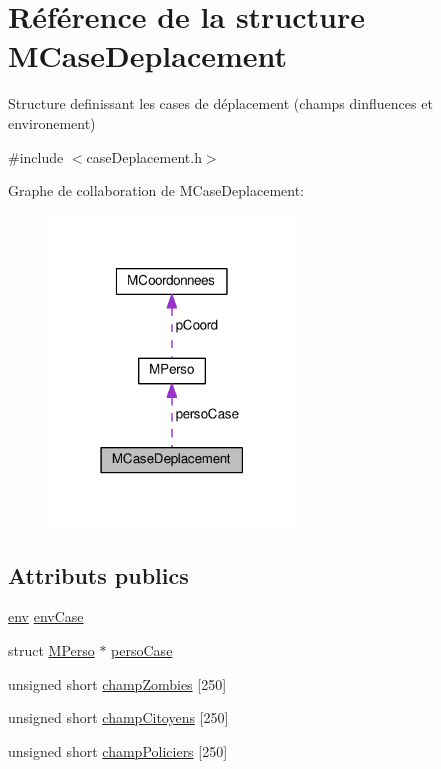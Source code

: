 \hypertarget{structMCaseDeplacement}{}\section{Référence de la structure M\+Case\+Deplacement}
\label{structMCaseDeplacement}


Structure definissant les cases de déplacement (champs d\textquotesingle{}influences et environement)  




{\ttfamily \#include $<$case\+Deplacement.\+h$>$}



Graphe de collaboration de M\+Case\+Deplacement\+:
\nopagebreak
\begin{figure}[H]
\begin{center}
\leavevmode
\includegraphics[width=186pt]{structMCaseDeplacement__coll__graph}
\end{center}
\end{figure}
\subsection*{Attributs publics}
\begin{DoxyCompactItemize}
\item 
\hyperlink{caseDeplacement_8h_af9a4f51a2aa1485342c48472a9124d83}{env} \hyperlink{structMCaseDeplacement_a39fe908c7afa0eb210c77d12bb96a99e}{env\+Case}
\item 
struct \hyperlink{structMPerso}{M\+Perso} $\ast$ \hyperlink{structMCaseDeplacement_a4c1dce63d49728610cc667865d0661e2}{perso\+Case}
\item 
unsigned short \hyperlink{structMCaseDeplacement_a3507b4494325ec01693f9034eed8f681}{champ\+Zombies} \mbox{[}250\mbox{]}
\item 
unsigned short \hyperlink{structMCaseDeplacement_a992e7ffc50e45a8fb49a982dcc392aa8}{champ\+Citoyens} \mbox{[}250\mbox{]}
\item 
unsigned short \hyperlink{structMCaseDeplacement_a98792df104a1bbab569aa9d0a86af554}{champ\+Policiers} \mbox{[}250\mbox{]}
\end{DoxyCompactItemize}


